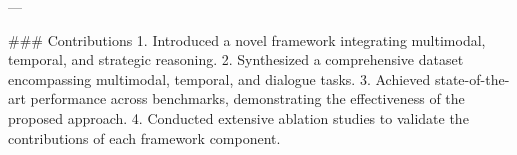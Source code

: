 ---

### Contributions  
1. Introduced a novel framework integrating multimodal, temporal, and strategic reasoning.  
2. Synthesized a comprehensive dataset encompassing multimodal, temporal, and dialogue tasks.  
3. Achieved state-of-the-art performance across benchmarks, demonstrating the effectiveness of the proposed approach.  
4. Conducted extensive ablation studies to validate the contributions of each framework component.